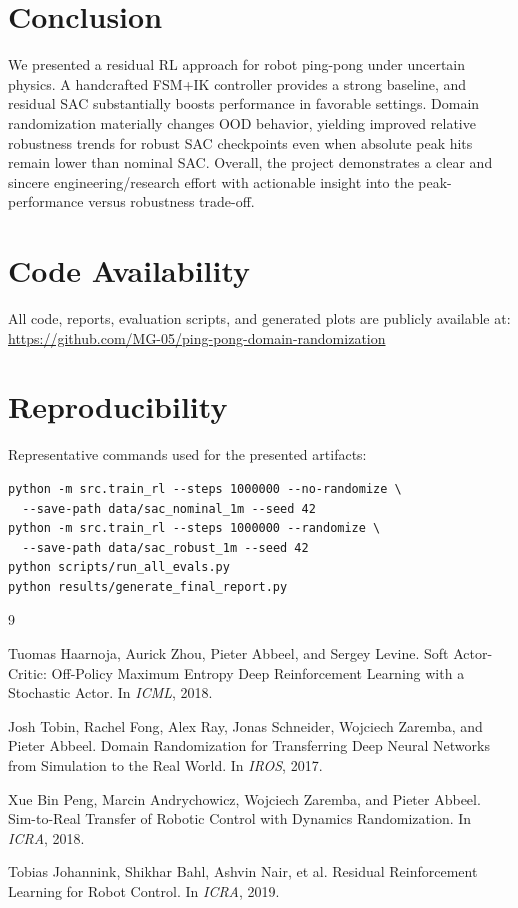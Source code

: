 \documentclass[10pt,twocolumn,letterpaper]{article}
\begin{document}
\section{Conclusion}
We presented a residual RL approach for robot ping-pong under uncertain physics. A handcrafted FSM+IK controller provides a strong baseline, and residual SAC substantially boosts performance in favorable settings. Domain randomization materially changes OOD behavior, yielding improved relative robustness trends for robust SAC checkpoints even when absolute peak hits remain lower than nominal SAC. Overall, the project demonstrates a clear and sincere engineering/research effort with actionable insight into the peak-performance versus robustness trade-off.

\section*{Code Availability}
All code, reports, evaluation scripts, and generated plots are publicly available at:
\url{https://github.com/MG-05/ping-pong-domain-randomization}

\section*{Reproducibility}
Representative commands used for the presented artifacts:
\begin{verbatim}
python -m src.train_rl --steps 1000000 --no-randomize \
  --save-path data/sac_nominal_1m --seed 42
python -m src.train_rl --steps 1000000 --randomize \
  --save-path data/sac_robust_1m --seed 42
python scripts/run_all_evals.py
python results/generate_final_report.py
\end{verbatim}

\begin{thebibliography}{9}

Tuomas Haarnoja, Aurick Zhou, Pieter Abbeel, and Sergey Levine.
\newblock Soft Actor-Critic: Off-Policy Maximum Entropy Deep Reinforcement Learning with a Stochastic Actor.
\newblock In \emph{ICML}, 2018.

Josh Tobin, Rachel Fong, Alex Ray, Jonas Schneider, Wojciech Zaremba, and Pieter Abbeel.
\newblock Domain Randomization for Transferring Deep Neural Networks from Simulation to the Real World.
\newblock In \emph{IROS}, 2017.

Xue Bin Peng, Marcin Andrychowicz, Wojciech Zaremba, and Pieter Abbeel.
\newblock Sim-to-Real Transfer of Robotic Control with Dynamics Randomization.
\newblock In \emph{ICRA}, 2018.

Tobias Johannink, Shikhar Bahl, Ashvin Nair, et al.
\newblock Residual Reinforcement Learning for Robot Control.
\newblock In \emph{ICRA}, 2019.

\end{thebibliography}
\end{document}
